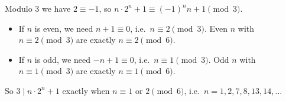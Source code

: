 Modulo $3$ we have $2\equiv-1$, so $n\cdot2^n+1\equiv(-1)^n n+1\pmod3$.
\begin{itemize}
\item If $n$ is even, we need $n+1\equiv0$, i.e.\ $n\equiv2\pmod3$. Even $n$ with $n\equiv2\pmod3$ are exactly $n\equiv2\pmod6$.
\item If $n$ is odd, we need $-n+1\equiv0$, i.e.\ $n\equiv1\pmod3$. Odd $n$ with $n\equiv1\pmod3$ are exactly $n\equiv1\pmod6$.
\end{itemize}
So $3\mid n\cdot2^n+1$ exactly when $\boxed{n\equiv1\text{ or }2\pmod6}$, i.e.\ $n=1,2,7,8,13,14,\dots$
